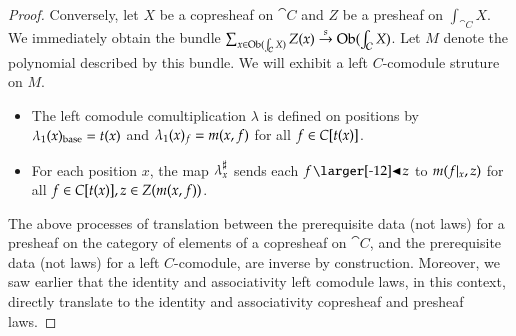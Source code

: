 \documentclass{amsart}
\begin{document}
\begin{proof}
  Conversely, let $X$ be a copresheaf on $\cat{C}$ and $Z$ be a
  presheaf on $\int_{\cat{C}}X$. We immediately obtain the bundle
  ${\sum_{x \in \operatorname{Ob}(\int_{\mathcal{C}}X)}Z(x) \overset{s}{\to}
    \operatorname{Ob}(\int_{\mathcal{C}}X)}$. Let $M$ denote the polynomial described by
  this bundle. We will exhibit a left $C$-comodule struture on $M$.
  \begin{itemize}
  \item The left comodule comultiplication $\lambda$ is defined on
    positions by ${\lambda}_1(x)_{\mathrm{base}} = t(x)$ and
    ${\lambda}_1(x)_f = m(x,f)$ for all ${f \in C[t(x)]}$.
  \item For each position $x$, the map ${\lambda}^\sharp_{x}$ sends each
    $f \subd z$ to $m(f|_{x}, z)$ for all
    ${f \in C[t(x)]}, {z \in Z(m(x,f))}$.
  \end{itemize}

  The above processes of translation between the prerequisite data
  (not laws) for a presheaf on the category of elements of a
  copresheaf on $\cat{C}$, and the prerequisite data (not laws) for a
  left $C$-comodule, are inverse by construction. Moreover, we saw
  earlier that the identity and associativity left comodule
  laws, in this context, directly translate to the identity and
  associativity copresheaf and presheaf laws.
\end{proof}
\end{document}
